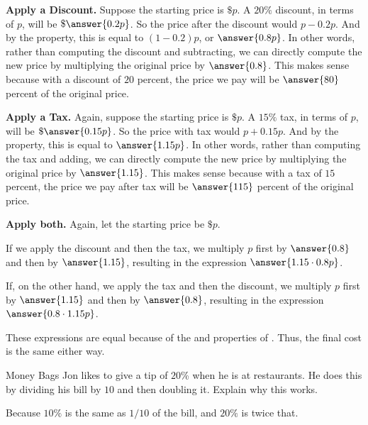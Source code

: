 \documentclass[nooutcomes]{ximera}
\begin{document}
\begin{problem}
\begin{problem}
\textbf{Apply a Discount.}
Suppose the starting price is $\$p$.  A $20\%$ discount, in terms of $p$, will be $\$\answer{0.2p}$.  So the price after the discount would $p - 0.2p$.  And by the  property, this is equal to $(1-0.2)p$, or $\answer{0.8p}$.  In other words, rather than computing the discount and subtracting, we can directly compute the new price by multiplying the original price by $\answer{0.8}$.  This makes sense because with a discount of $20$ percent, the price we pay will be $\answer{80}$ percent of the original price.  
\begin{problem}
\textbf{Apply a Tax.}
Again, suppose the starting price is $\$p$.  A $15\%$ tax, in terms of $p$, will be $\$\answer{0.15p}$.  So the price with tax would $p + 0.15p$.  And by the  property, this is equal to $\answer{1.15p}$.  In other words, rather than computing the tax and adding, we can directly compute the new price by multiplying the original price by $\answer{1.15}$.  This makes sense because with a tax of $15$ percent, the price we pay after tax will be $\answer{115}$ percent of the original price.  
\begin{problem}
\textbf{Apply both.} Again, let the starting price be $\$p$.  

If we apply the discount and then the tax, we multiply $p$ first by $\answer{0.8}$ and then by $\answer{1.15}$, resulting in the expression $\answer{1.15\cdot 0.8p}$. 

If, on the other hand, we apply the tax and then the discount, we multiply $p$ first by $\answer{1.15}$ and then by $\answer{0.8}$, resulting in the expression $\answer{0.8\cdot 1.15p}$. 

These expressions are equal because of the  and  properties of .  Thus, the final cost is the same either way. 
\end{problem}
\end{problem} 
\end{problem}
\end{problem}


\begin{problem}Money Bags Jon likes to give a tip of $20$\% when he is at
  restaurants. He does this by dividing his bill by $10$ and then
  doubling it. Explain why this works.
\begin{freeResponse}
\begin{hint}
Because $10\%$ is the same as $1/10$ of the bill, and $20\%$ is twice that.  
\end{hint}
\end{freeResponse}
\end{problem} 
\end{document}
